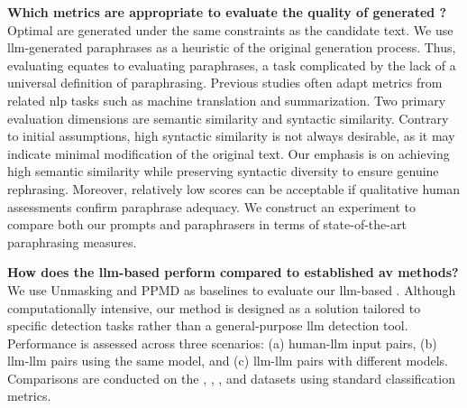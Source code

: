 \begin{questions}
    \item \textbf{Which metrics are appropriate to evaluate the quality of generated \imps{}?} \label{enum:rq2} \hfill \\
    Optimal \imps{} are generated under the same constraints as the candidate text.
    We use \ac{llm}-generated paraphrases as a heuristic of the original generation process.
    Thus, evaluating \imps{} equates to evaluating paraphrases, a task complicated by the lack of a universal definition of paraphrasing.
    Previous studies often adapt metrics from related \ac{nlp} tasks such as machine translation and summarization.
    Two primary evaluation dimensions are semantic similarity and syntactic similarity.
    Contrary to initial assumptions, high syntactic similarity is not always desirable, as it may indicate minimal modification of the original text.
    Our emphasis is on achieving high semantic similarity while preserving syntactic diversity to ensure genuine rephrasing.
    Moreover, relatively low scores can be acceptable if qualitative human assessments confirm paraphrase adequacy.
    We construct an experiment to compare both our prompts and paraphrasers in terms of state-of-the-art paraphrasing measures. 


    \item \textbf{How does the \ac{llm}-based \impAppr{} perform compared to established \ac{av} methods?} \label{enum:rq3} \hfill \\
    We use Unmasking and PPMD as baselines to evaluate our \ac{llm}-based \impAppr{}.
    Although computationally intensive, our method is designed as a solution tailored to specific detection tasks  rather than a general-purpose \ac{llm} detection tool.
    Performance is assessed across three scenarios: (a) human-\ac{llm} input pairs,
    (b) \ac{llm}-\ac{llm} pairs using the same model, and (c) \ac{llm}-\ac{llm} pairs with different models.
    Comparisons are conducted on the \dataStudent{}, \dataBlog{}, \dataGutenberg{}, and \dataPan{} datasets using standard classification metrics.
    
\end{questions}


